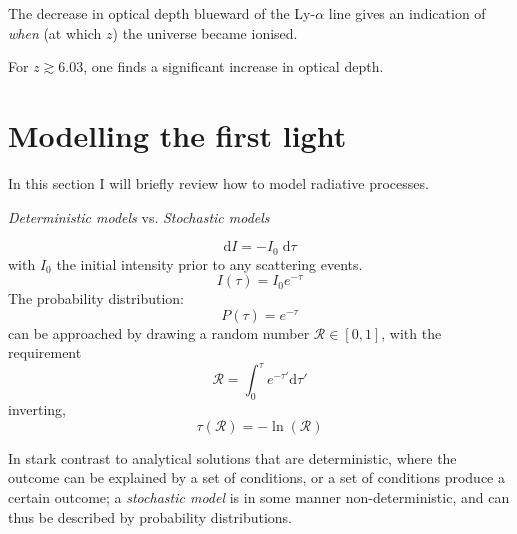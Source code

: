 \documentclass[ignorenonframetext]{beamer}
\newcommand{\diff}{\ensuremath{\; \text{d}}}
\newcommand{\diffd}{\ensuremath{\text{d}}}
\begin{document}
The decrease in optical depth blueward of the Ly-$\alpha$ line gives an indication of \textit{when} (at which $z$) the universe became ionised. 

For $z \gtrsim 6.03$, one finds a significant increase in optical depth.

\section{Modelling the first light}
In this section I will briefly review how to model radiative processes.

\begin{frame}

\begin{center}
    \textit{Deterministic models}   \quad vs. \quad \textit{Stochastic models}
\end{center}

\pause \begin{equation}
    \diffd I = -I_0 \diff \tau
    \label{eq:diffIntensity}
\end{equation}
with $I_0$ the initial intensity prior to any scattering events. 
\pause \begin{equation}
    I(\tau) = I_0 e^{-\tau}
    \label{eq:intensity}
\end{equation}
\pause The probability distribution:
\begin{equation}
    P(\tau) = e^{-\tau}
    \label{eq:ptau}
\end{equation}
\pause can be approached by drawing a random number $\mathcal{R} \in [0,1]$, with the requirement
\begin{equation}
    \mathcal{R} = \int_{0}^{\tau} e^{-\tau'} \diffd \tau'
    \label{eq:R_req}
\end{equation}
inverting,
\begin{equation}
    \tau(\mathcal{R}) = -\ln \left( \mathcal{R} \right)
    \label{eq:randtau}
\end{equation}
\end{frame}

In stark contrast to analytical solutions that are deterministic, where the outcome can be explained by a set of conditions, or a set of conditions produce a certain outcome; a \textit{stochastic model} is in some manner non-deterministic, and can thus be described by probability distributions. 
\end{document}

